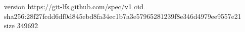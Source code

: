 version https://git-lfs.github.com/spec/v1
oid sha256:28f27fcdd6df0d845ebd8fa34ec1b7a3e57965281239f8e346d4979ee9557e21
size 349692
